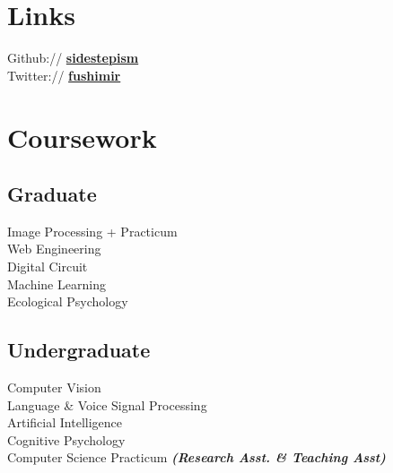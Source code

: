 \documentclass[letterpaper]{deedy-resume} %
\begin{document}
\begin{minipage}[t]{0.33\textwidth}

\section{Links}

Github:// \href{https://github.com/sidestepism}{\bf sidestepism} \\
Twitter:// \href{https://twitter.com/fushimir}{\bf fushimir} \\

\sectionspace %


\section{Coursework}

\subsection{Graduate}

Image Processing + Practicum \\
Web Engineering \\
Digital Circuit \\
Machine Learning \\
Ecological Psychology

\sectionspace %


\subsection{Undergraduate}

Computer Vision \\
Language \& Voice Signal Processing \\
Artificial Intelligence \\
Cognitive Psychology \\
Computer Science Practicum
{\footnotesize \textit{\textbf{(Research Asst. \& Teaching Asst) }}} \\


\end{minipage}
\end{document}
